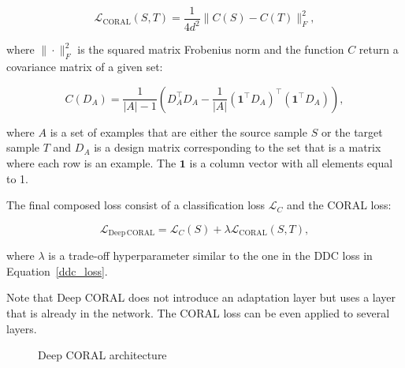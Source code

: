 \begin{equation}
	\mathcal{L}_{\mathrm{CORAL}}(S, T) = \frac{1}{4 d^2} \|C(S) - C(T)\|_F^2,
	\label{coral_loss}
\end{equation}

where \(\|\cdot\|_F^2\) is the squared matrix Frobenius norm
and the function \(C\) return a covariance matrix of a given set:

\begin{equation}
	C(D_A) = \frac{1}{|A| - 1} (D_A^\top D_A
	- \frac{1}{|A|} (\mathbf{1}^\top D_A)^\top (\mathbf{1}^\top D_A)),
	\label{deep_coral_loss}
\end{equation}

where \(A\) is a set of examples
that are either the source sample \(S\) or the target sample \(T\)
and \(D_A\) is a design matrix corresponding to the set
that is a matrix where each row is an example.
The \(\mathbf{1}\) is a column vector with all elements equal to 1.

The final composed loss consist of a classification loss \(\mathcal{L}_C\)
and the CORAL loss:

\begin{equation}
	\mathcal{L}_{\mathrm{Deep\,CORAL}}
	= \mathcal{L}_C(S) + \lambda \mathcal{L}_{\mathrm{CORAL}}(S, T),
\end{equation}

where \(\lambda\) is a trade-off hyperparameter similar to the one in the DDC loss in Equation~\ref{ddc_loss}.

Note that Deep CORAL does not introduce an adaptation layer
but uses a layer that is already in the network.
The CORAL loss can be even applied to several layers.

\begin{figure}
\begin{center}
\end{center}
\caption{Deep CORAL architecture}
\end{figure}

